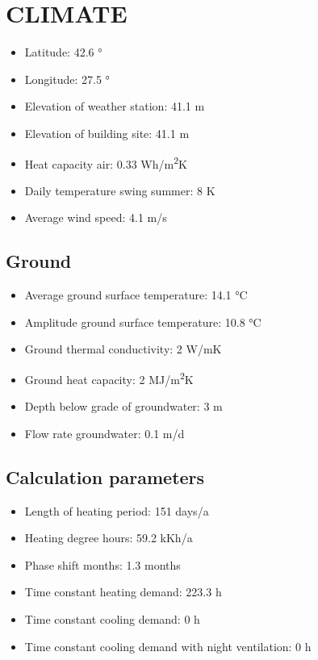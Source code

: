 \documentclass{article}
\begin{document}
\section*{CLIMATE}

\begin{itemize}
    \item Latitude: 42.6 °
    \item Longitude: 27.5 °
    \item Elevation of weather station: 41.1 m
    \item Elevation of building site: 41.1 m
    \item Heat capacity air: 0.33 Wh/m\textsuperscript{2}K
    \item Daily temperature swing summer: 8 K
    \item Average wind speed: 4.1 m/s
\end{itemize}

\subsection*{Ground}

\begin{itemize}
    \item Average ground surface temperature: 14.1 °C
    \item Amplitude ground surface temperature: 10.8 °C
    \item Ground thermal conductivity: 2 W/mK
    \item Ground heat capacity: 2 MJ/m\textsuperscript{2}K
    \item Depth below grade of groundwater: 3 m
    \item Flow rate groundwater: 0.1 m/d
\end{itemize}

\subsection*{Calculation parameters}

\begin{itemize}
    \item Length of heating period: 151 days/a
    \item Heating degree hours: 59.2 kKh/a
    \item Phase shift months: 1.3 months
    \item Time constant heating demand: 223.3 h
    \item Time constant cooling demand: 0 h
    \item Time constant cooling demand with night ventilation: 0 h
\end{itemize}
\end{document}
